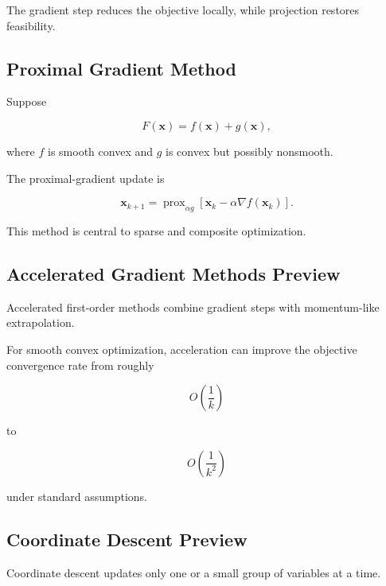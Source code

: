 The gradient step reduces the objective locally, while projection restores
feasibility.

\subsection{Proximal Gradient Method}
\label{subsec:proximal-gradient}

Suppose

\[
\boxed{
F(\mathbf{x})
=
f(\mathbf{x})
+
g(\mathbf{x}),
}
\]

where \(f\) is smooth convex and \(g\) is convex but possibly nonsmooth.

The proximal-gradient update is

\[
\boxed{
\mathbf{x}_{k+1}
=
\operatorname{prox}_{\alpha g}
\left[
\mathbf{x}_k
-
\alpha
\nabla f(\mathbf{x}_k)
\right].
}
\]

This method is central to sparse and composite optimization.

\subsection{Accelerated Gradient Methods Preview}
\label{subsec:accelerated-gradient-preview}

Accelerated first-order methods combine gradient steps with momentum-like
extrapolation.

For smooth convex optimization, acceleration can improve the objective
convergence rate from roughly

\[
\boxed{
O\left(\frac1k\right)
}
\]

to

\[
\boxed{
O\left(\frac1{k^2}\right)
}
\]

under standard assumptions.

\subsection{Coordinate Descent Preview}
\label{subsec:coordinate-descent-preview}

Coordinate descent updates only one or a small group of variables at a
time.

